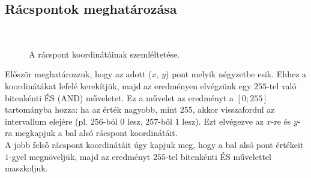 \documentclass[12pt]{article}
\begin{document}
\subsection{Rácspontok meghatározása}
\begin{figure}
    \centering
    \vspace{-40pt}
    \\
    \caption{A rácspont koordinátáinak szemléltetése.}
    \vspace{10pt}
\end{figure}
Először meghatározzuk, hogy az adott ($x$, $y$) pont melyik négyzetbe esik. Ehhez a koordinátákat lefelé kerekítjük, majd az
eredményen elvégzünk egy $255$-tel való bitenkénti ÉS (AND) műveletet. Ez a művelet az eredményt a $[0;255]$
tartományba hozza: ha az érték nagyobb, mint $255$, akkor visszafordul az
intervallum elejére (pl. $256$-ból $0$ lesz, $257$-ből $1$ lesz). Ezt elvégezve az $x$-re és $y$-ra
megkapjuk a bal alsó rácspont koordinátáit.\\
A jobb felső rácspont koordinátáit úgy kapjuk meg, hogy a bal alsó pont értékeit $1$-gyel megnöveljük, majd az eredményt $255$-tel bitenkénti ÉS művelettel maszkoljuk.
\end{document}
